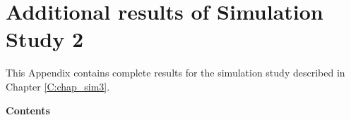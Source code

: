 \chapter{Additional results of Simulation Study 2}

\label{A:sim3res}

This Appendix contains complete results for the simulation study described in Chapter \ref{C:chap_sim3}. 
\clearpage

\large\textbf{Contents}\\

\scalebox{0.7}{

}
\clearpage



